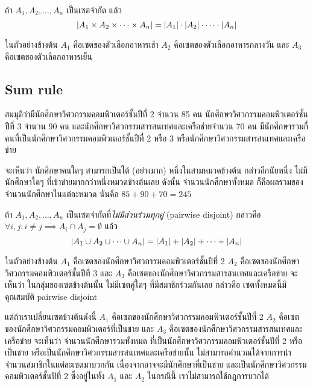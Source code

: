 \begin{theorem}
\newcommand\card[1]{\ensuremath\left|#1\right|}
ถ้า $A_1,A_2,\ldots,A_n$ เป็นเซตจำกัด แล้ว
\[\card{A_1\times A_2\times \cdots\times A_n}=\card{A_1}\cdot\card{A_2}\cdot \cdots \cdot \card{A_n}\]
\end{theorem}
ในตัวอย่างข้างต้น $A_1$ คือเซตของตัวเลือกอาหารเช้า $A_2$ คือเซตของตัวเลือกอาหารกลางวัน และ $A_3$ คือเซตของตัวเลือกอาหารเย็น

\subsection{Sum rule}
\begin{example}
สมมุติว่ามีนักศึกษาวิศวกรรมคอมพิวเตอร์ชั้นปีที่ 2 จำนวน 85 คน นักศึกษาวิศวกรรมคอมพิวเตอร์ชั้นปีที่ 3 จำนวน 90 คน และนักศึกษาวิศวกรรมสารสนเทศและเครือช่ายจำนวน 70 คน \enskip มีนักศึกษารวมกี่คนที่เป็นนักศึกษาวิศวกรรมคอมพิวเตอร์ชั้นปีที่ 2 หรือ 3 หรือนักศึกษาวิศวกรรมสารสนเทศและเครือข่าย

จะเห็นว่า นักศึกษาคนใดๆ สามารถเป็นได้ (อย่างมาก) หนึ่งในสามหมวดข้างต้น \enskip กล่าวอีกนัยหนึ่ง ไม่มีนักศึกษาใดๆ ที่เข้าข่ายมากกว่าหนึ่งหมวดข้างต้นเลย \enskip ดังนั้น จำนวนนักศึกษาทั้งหมด ก็คือผลรวมของจำนวนนักศึกษาในแต่ละหมวด นั่นคือ $85+90+70=245$
\end{example}

\begin{theorem}
\newcommand\card[1]{\ensuremath\left|#1\right|}
ถ้า $A_1,A_2,\ldots,A_n$ เป็นเซตจำกัดที่\emph{ไม่มีส่วนร่วมทุกคู่} (pairwise disjoint) กล่าวคือ $\forall i,j: i\neq j\implies A_i\cap A_j=\emptyset$ แล้ว
\[\card{A_1\cup A_2\cup \cdots\cup A_n}=\card{A_1}+\card{A_2}+ \cdots + \card{A_n}\]
\end{theorem}
ในตัวอย่างข้างต้น $A_1$ คือเซตของนักศึกษาวิศวกรรมคอมพิวเตอร์ชั้นปีที่ 2 $A_2$ คือเซตของนักศึกษาวิศวกรรมคอมพิวเตอร์ชั้นปีที่ 3 และ $A_3$ คือเซตของนักศึกษาวิศวกรรมสารสนเทศและเครือข่าย \enskip จะเห็นว่า ในกลุ่มของเซตข้างต้นนั้น ไม่มีเซตคู่ใดๆ ที่มีสมาชิกร่วมกันเลย กล่าวคือ เซตทั้งหมดนี้มีคุณสมบัติ pairwise disjoint

แต่ถ้าเราเปลี่ยนเซตข้างต้นดังนี้ $A_1$ คือเซตของนักศึกษาวิศวกรรมคอมพิวเตอร์ชั้นปีที่ 2 $A_2$ คือเซตของนักศึกษาวิศวกรรมคอมพิวเตอร์ที่เป็นชาย และ $A_3$ คือเซตของนักศึกษาวิศวกรรมสารสนเทศและเครือข่าย จะเห็นว่า จำนวนนักศึกษารวมทั้งหมด ที่เป็นนักศึกษาวิศวกรรมคอมพิวเตอร์ชั้นปีที่ 2 หรือเป็นชาย หรือเป็นนักศึกษาวิศวกรรมสารสนเทศและเครือข่ายนั้น ไม่สามารถคำนวณได้จากการนำจำนวนสมาชิกในแต่ละเซตมาบวกกัน เนื่องจากอาจจะมีนักศึกษาที่เป็นชาย และเป็นนักศึกษาวิศวกรรมคอมพิวเตอร์ชั้นปีที่ 2 ซึ่งอยู่ในทั้ง $A_1$ และ $A_2$ \enskip ในกรณีนี้ เราไม่สามารถใช้กฎการบวกได้

